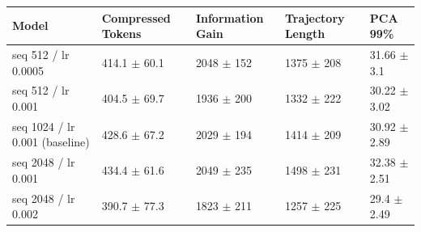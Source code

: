 \begin{tabular}{lllll}
\toprule
 Model                          & Compressed Tokens         & Information Gain        & Trajectory Length       & PCA 99\%                   \\
\midrule
 seq 512 / lr 0.0005            & 414.1 {\small $\pm$ 60.1} & 2048 {\small $\pm$ 152} & 1375 {\small $\pm$ 208} & 31.66 {\small $\pm$ 3.1}  \\
 seq 512 / lr 0.001             & 404.5 {\small $\pm$ 69.7} & 1936 {\small $\pm$ 200} & 1332 {\small $\pm$ 222} & 30.22 {\small $\pm$ 3.02} \\
 \midrule
 seq 1024 / lr 0.001 (baseline) & 428.6 {\small $\pm$ 67.2} & 2029 {\small $\pm$ 194} & 1414 {\small $\pm$ 209} & 30.92 {\small $\pm$ 2.89} \\
 \midrule
 seq 2048 / lr 0.001            & 434.4 {\small $\pm$ 61.6} & 2049 {\small $\pm$ 235} & 1498 {\small $\pm$ 231} & 32.38 {\small $\pm$ 2.51} \\
 seq 2048 / lr 0.002            & 390.7 {\small $\pm$ 77.3} & 1823 {\small $\pm$ 211} & 1257 {\small $\pm$ 225} & 29.4 {\small $\pm$ 2.49}  \\
\bottomrule
\end{tabular}
